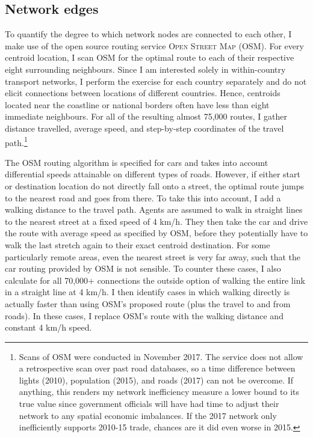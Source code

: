 \documentclass[11pt, oneside]{article}   	%
\begin{document}
\subsection{Network edges}
To quantify the degree to which network nodes are connected to each other, I make use of the open source routing service \textsc{Open Street Map} (OSM). For every centroid location, I scan OSM for the optimal route to each of their respective eight surrounding neighbours. Since I am interested solely in within-country transport networks, I perform the exercise for each country separately and do not elicit connections between locations of different countries. Hence, centroids located near the coastline or national borders often have less than eight immediate neighbours. For all of the resulting almost 75,000 routes, I gather distance travelled, average speed, and step-by-step coordinates of the travel path.\footnote{Scans of OSM were conducted in November 2017. The service does not allow a retrospective scan over past road databases, so a time difference between lights (2010), population (2015), and roads (2017) can not be overcome. If anything, this renders my network inefficiency measure a lower bound to its true value since government officials will have had time to adjust their network to any spatial economic imbalances. If the 2017 network only inefficiently supports 2010-15 trade, chances are it did even worse in 2015.}


The OSM routing algorithm is specified for cars and takes into account differential speeds attainable on different types of roads. However, if either start or destination location do not directly fall onto a street, the optimal route jumps to the nearest road and goes from there. To take this into account, I add a walking distance to the travel path. Agents are assumed to walk in straight lines to the nearest street at a fixed speed of 4 km/h. They then take the car and drive the route with average speed as specified by OSM, before they potentially have to walk the last stretch again to their exact centroid destination. For some particularly remote areas, even the nearest street is very far away, such that the car routing provided by OSM is not sensible. To counter these cases, I also calculate for all 70,000+ connections the outside option of walking the entire link in a straight line at 4 km/h. I then identify cases in which walking directly is actually faster than using OSM's proposed route (plus the travel to and from roads). In these cases, I replace OSM's route with the walking distance and constant 4 km/h speed.
\end{document}
